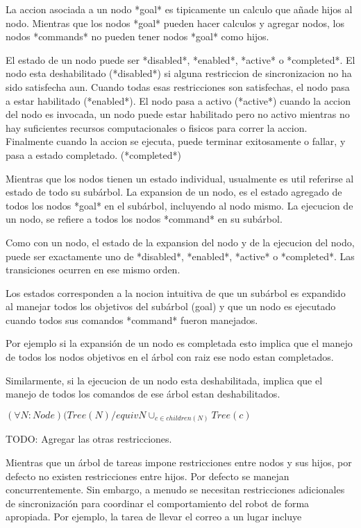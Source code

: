 \documentclass[a4paper, 11pt, oneside]{article}
\begin{document}
La accion asociada a un nodo *goal* es tipicamente un calculo que añade
hijos al nodo. 
Mientras que los nodos *goal* pueden hacer calculos y agregar nodos, 
los nodos *commands* no pueden tener nodos *goal* como hijos.

El estado de un nodo puede ser *disabled*, *enabled*, *active* o *completed*.
El nodo esta deshabilitado (*disabled*) si alguna restriccion de sincronizacion
 no ha sido satisfecha aun.
Cuando todas esas restricciones son satisfechas, el nodo pasa a estar 
habilitado (*enabled*).
El nodo pasa a activo (*active*) cuando la accion del nodo es invocada, 
un nodo puede estar habilitado pero no activo mientras
no hay suficientes recursos computacionales o fisicos para correr la accion.
Finalmente cuando la accion se ejecuta, puede terminar exitosamente o fallar,
 y pasa a estado completado. (*completed*)

Mientras que los nodos tienen un estado individual, usualmente es util 
referirse al estado de todo su subárbol.
La expansion de un nodo, es el estado agregado de todos los nodos *goal* en el
 subárbol, incluyendo al nodo mismo.
La ejecucion de un nodo, se refiere a todos los nodos *command* en su subárbol.

Como con un nodo, el estado de la expansion del nodo y de la ejecucion del 
nodo, puede ser 
exactamente uno de *disabled*, *enabled*, *active* o *completed*. Las 
transiciones ocurren en ese mismo orden.

Los estados corresponden a la nocion intuitiva de que un subárbol es expandido
 al manejar todos los objetivos del subárbol (goal) y que
un nodo es ejecutado cuando todos sus comandos *command* fueron manejados.

Por ejemplo si la expansión de un nodo es completada esto implica que el 
manejo de todos los nodos objetivos en el árbol con raiz
ese nodo estan completados.

Similarmente, si la ejecucion de un nodo esta deshabilitada, implica que el 
manejo de todos los comandos de ese 
árbol estan deshabilitados.

$(\forall N: Node)(Tree(N) /equiv {N} \cup_{c \in children(N)} Tree (c)$

TODO: Agregar las otras restricciones.

Mientras que un árbol de tareas impone restricciones entre nodos y sus hijos, 
por defecto no existen restricciones entre 
hijos. Por defecto se manejan concurrentemente.
Sin embargo, a menudo se necesitan restricciones adicionales de sincronización
para coordinar el comportamiento del robot de forma apropiada.
Por ejemplo, la tarea de llevar  el correo a un lugar incluye 
\end{document}
